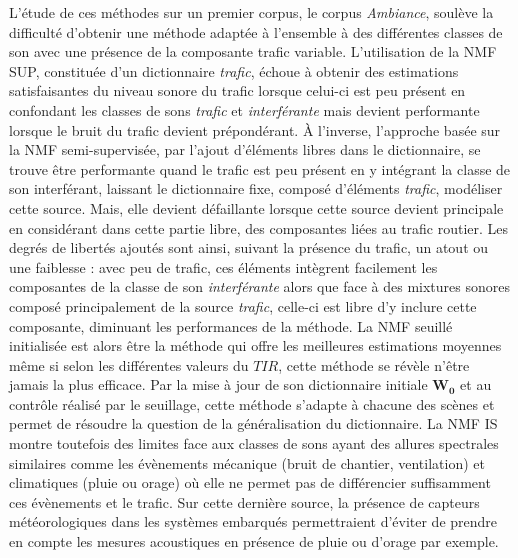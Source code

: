 L'étude de ces méthodes sur un premier corpus, le corpus \textit{Ambiance}, soulève la difficulté d'obtenir une méthode adaptée à l'ensemble à des différentes classes de son avec une présence de la composante trafic variable. 
L'utilisation de la NMF SUP, constituée d'un dictionnaire \textit{trafic}, échoue à obtenir des estimations satisfaisantes du niveau sonore du trafic lorsque celui-ci est peu présent en confondant les classes de sons \textit{trafic} et \textit{interférante} mais devient performante lorsque le bruit du trafic devient prépondérant. 
À l'inverse, l'approche basée sur la NMF semi-supervisée, par l'ajout d'éléments libres dans le dictionnaire, se trouve être performante quand le trafic est peu présent en y intégrant la classe de son interférant, laissant le dictionnaire fixe, composé d'éléments \textit{trafic}, modéliser cette source. 
Mais, elle devient défaillante lorsque cette source devient principale en considérant dans cette partie libre, des composantes liées au trafic routier. Les degrés de libertés ajoutés sont ainsi, suivant la présence du trafic, un atout ou une faiblesse : avec peu de trafic, ces éléments intègrent facilement les composantes de la classe de son \textit{interférante} alors que face à des mixtures sonores composé principalement de la source \textit{trafic}, celle-ci est libre d'y inclure cette composante, diminuant les performances de la méthode.
La NMF seuillé initialisée est alors être la méthode qui offre les meilleures estimations moyennes même si selon les différentes valeurs du $TIR$, cette méthode se révèle n'être jamais la plus efficace. Par la mise à jour de son dictionnaire initiale $\mathbf{W_0}$ et au contrôle réalisé par le seuillage, cette méthode s'adapte à chacune des scènes et permet de résoudre la question de la généralisation du dictionnaire. La NMF IS montre toutefois des limites face aux classes de sons ayant des allures spectrales similaires comme les évènements mécanique (bruit de chantier, ventilation) et climatiques (pluie ou orage) où elle ne permet pas de différencier suffisamment ces évènements et le trafic. Sur cette dernière source, la présence de capteurs météorologiques dans les systèmes embarqués permettraient d'éviter de prendre en compte les mesures acoustiques en présence de pluie ou d'orage par exemple.

